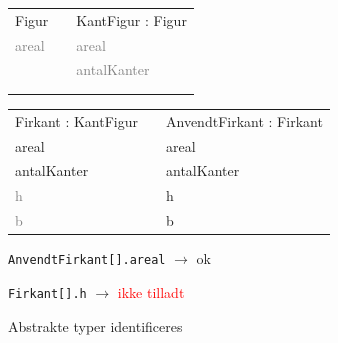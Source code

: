 \begin{frame}[fragile] 
\begin{table}[h]
\begin{tabular}{|l|l|l|}
 \cline{1-1} \cline{3-3} 
Figur          &  & KantFigur : Figur    \\ \cline{1-1} \cline{3-3} 
\textcolor{gray}{areal} &  & \textcolor{gray}{areal}       \\
               &  & \textcolor{gray}{antalKanter} \\
               &  &                      \\
               &  &                      \\ \cline{1-1} \cline{3-3} 
\end{tabular}
\end{table}
\begin{table}[h]
\begin{tabular}{|l|l|l|}
 \cline{1-1} \cline{3-3} 
Firkant : KantFigur &  & AnvendtFirkant : Firkant       \\ \cline{1-1} \cline{3-3} 
areal               &  & areal                \\
antalKanter         &  & antalKanter          \\
\textcolor{gray}{h}          &  & h                    \\
\textcolor{gray}{b}          &  & b                    \\ \cline{1-1} \cline{3-3} 
\end{tabular}
\end{table}
\begin{center}
\texttt{AnvendtFirkant[].areal} $\rightarrow$ ok

\texttt{Firkant[].h} $\rightarrow$ \textcolor{red}{ikke tilladt}

Abstrakte typer identificeres
\end{center}
\end{frame}

